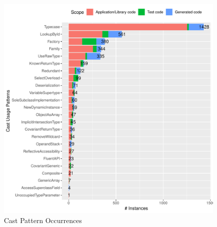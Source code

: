 \begin{figure}[ht!]
\centering
\includegraphics[width=\textwidth]{analysis/table-patterns.pdf}
\caption{Cast Pattern Occurrences} \label{fig:patterns}
\end{figure}

% 

